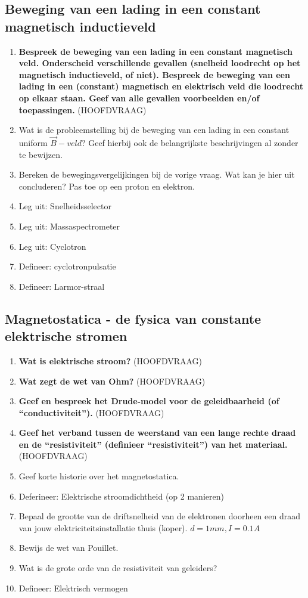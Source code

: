 \documentclass[12pt]{article}
\begin{document}
    \subsection{Beweging van een lading in een constant magnetisch inductieveld}
    \begin{enumerate}
        \item \textbf{Bespreek de beweging van een lading in een constant magnetisch veld. Onderscheid verschillende gevallen (snelheid loodrecht op het magnetisch inductieveld, of niet). Bespreek de beweging van een lading in een (constant) magnetisch en elektrisch veld die loodrecht op elkaar staan. Geef van alle gevallen voorbeelden en/of toepassingen.} (HOOFDVRAAG)
        \item Wat is de probleemstelling bij de beweging van een lading in een constant uniform $\vec{B}-veld$? Geef hierbij ook de belangrijkste beschrijvingen al zonder te bewijzen.
        \item Bereken de bewegingsvergelijkingen bij de vorige vraag. Wat kan je hier uit concluderen? Pas toe op een proton en elektron.
        \item Leg uit: Snelheidsselector
        \item Leg uit: Massaspectrometer
        \item Leg uit: Cyclotron
        \item Defineer: cyclotronpulsatie
        \item Defineer: Larmor-straal
    \end{enumerate}
    \subsection{Magnetostatica - de fysica van constante elektrische stromen}
    \begin{enumerate}
        \item \textbf{Wat is elektrische stroom?} (HOOFDVRAAG)
        \item \textbf{Wat zegt de wet van Ohm?} (HOOFDVRAAG)
        \item \textbf{Geef en bespreek het Drude-model voor de geleidbaarheid (of “conductiviteit”).} (HOOFDVRAAG)
        \item \textbf{Geef het verband tussen de weerstand van een lange rechte draad en de “resistiviteit” (definieer “resistiviteit”) van het materiaal.} (HOOFDVRAAG)
        \item Geef korte historie over het magnetostatica.
        \item Deferineer: Elektrische stroomdichtheid (op 2 manieren)
        \item Bepaal de grootte van de driftsnelheid van de elektronen doorheen een draad van jouw elektriciteitsinstallatie thuis (koper). $d=1mm, I=0.1A$
        \item Bewijs de wet van Pouillet.
        \item Wat is de grote orde van de resistiviteit van geleiders?
        \item Defineer: Elektrisch vermogen
    \end{enumerate}
\end{document}
